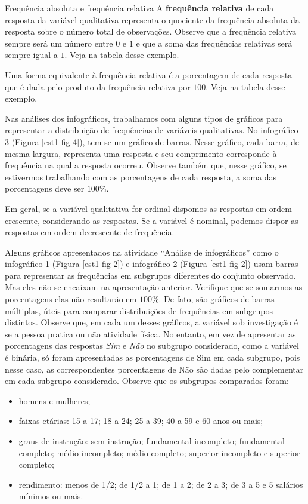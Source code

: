 \begin{example}{Frequência absoluta e frequência relativa}
A \textbf{frequência relativa} de cada resposta da variável qualitativa representa o quociente da frequência absoluta da resposta sobre o número total de observações. Observe que a frequência relativa sempre será um número entre $0$ e $1$ e que a soma das frequências relativas será sempre igual a $1$. Veja na tabela desse exemplo.

Uma forma equivalente à frequência relativa é a porcentagem de cada resposta que é dada pelo produto da frequência relativa por $100$. Veja na tabela desse exemplo.
\end{example}

Nas análises dos infográficos, trabalhamos com alguns tipos de gráficos para representar a distribuição de frequências de variáveis qualitativas. No \hyperref[est1-fig-4]{infográfico 3 (Figura \ref{est1-fig-4}}), tem-se um gráfico de barras. Nesse gráfico, cada barra, de mesma largura, representa uma resposta e seu comprimento corresponde à frequência na qual a resposta ocorreu. Observe também que, nesse gráfico, se estivermos trabalhando com as porcentagens de cada resposta, a soma das porcentagens deve ser $100\%$.

Em geral, se a variável qualitativa for ordinal dispomos as respostas em ordem crescente, considerando as respostas. Se a variável é nominal, podemos dispor as respostas em ordem decrescente de frequência.

Alguns gráficos apresentados na atividade “Análise de infográficos” como o \hyperref[est1-fig-4]{infográfico 1 (Figura \ref{est1-fig-2}}) e \hyperref[est1-fig-4]{infográfico 2 (Figura \ref{est1-fig-2}}) usam barras para representar as frequências em subgrupos diferentes do conjunto observado. Mas eles não se encaixam na apresentação anterior. Verifique que se somarmos as porcentagens elas não resultarão em $100\%$. De fato, são gráficos de barras múltiplas, úteis para comparar distribuições de frequências em subgrupos distintos. Observe que, em cada um desses gráficos, a variável sob investigação é se a pessoa pratica ou não atividade física. No entanto, em vez de apresentar as porcentagens das respostas \textit{Sim} e \textit{Não} no subgrupo considerado, como a variável é binária, só foram apresentadas as porcentagens de Sim em cada subgrupo, pois nesse caso, as correspondentes porcentagens de Não são dadas pelo complementar em cada subgrupo considerado. Observe que os subgrupos comparados foram:

\begin{itemize}
\item homens e mulheres;
\item faixas etárias: 15 a 17; 18 a 24; 25 a 39; 40 a 59 e 60 anos ou mais;
\item graus de instrução: sem instrução; fundamental incompleto; fundamental completo; médio incompleto; médio completo; superior incompleto e superior completo;
\item rendimento: menos de 1/2; de 1/2 a 1; de 1 a 2; de 2 a 3; de 3 a 5 e 5 salários mínimos ou mais.
\end{itemize}

